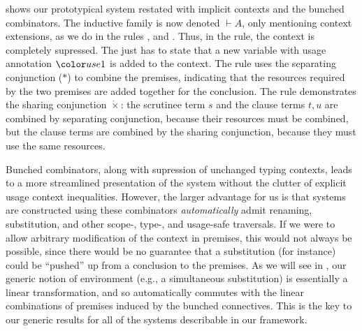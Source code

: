  shows our prototypical system restated with
implicit contexts and the bunched combinators. The inductive family is
now denoted $\vdash A$, only mentioning context extensions, as we do
in the rules ,
 and . Thus,
in the  rule, the context is completely
supressed. The  just has to state that a
new variable with usage annotation $\gr1$ is added to the
context. The  rule uses the separating
conjunction ($*$) to combine the premises, indicating that the
resources required by the two premises are added together for the
conclusion. The  rule demonstrates the
sharing conjunction $\dot\times$: the scrutinee term $s$ and the
clause terms $t, u$ are combined by separating conjunction, because
their resources must be combined, but the clause terms are combined by
the sharing conjunction, because they must use the same resources.

Bunched combinators, along with supression of unchanged typing
contexts, leads to a more streamlined presentation of the system
without the clutter of explicit usage context
inequalities. However, the larger advantage for us is that systems are
constructed using these combinators \emph{automatically} admit
renaming, substitution, and other scope-, type-, and usage-safe
traversals. If we were to allow arbitrary modification of the context
in premises, this would not always be possible, since there would be
no guarantee that a substitution (for instance) could be ``pushed'' up
from a conclusion to the premises. As we will see in ,
our generic notion of environment (e.g., a simultaneous substitution)
is essentially a linear transformation, and so automatically commutes
with the linear combinations of premises induced by the bunched
connectives. This is the key to our generic results for all of the
systems describable in our framework.
